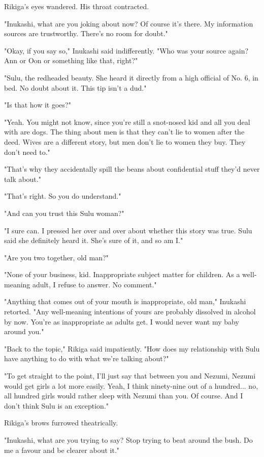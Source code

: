 Rikiga's eyes wandered. His throat contracted.

"Inukashi, what are you joking about now? Of course it's there. My
information sources are trustworthy. There's no room for doubt."

"Okay, if you say so," Inukashi said indifferently. "Who was your source
again? Ann or Oon or something like that, right?"

"Sulu, the redheaded beauty. She heard it directly from a high official
of No. 6, in bed. No doubt about it. This tip isn't a dud."

"Is that how it goes?"

"Yeah. You might not know, since you're still a snot-nosed kid and all
you deal with are dogs. The thing about men is that they can't lie to
women after the deed. Wives are a different story, but men don't lie to
women they buy. They don't need to."

"That's why they accidentally spill the beans about confidential stuff
they'd never talk about."

"That's right. So you do understand."

"And can you trust this Sulu woman?"

"I sure can. I pressed her over and over about whether this story was
true. Sulu said she definitely heard it. She's sure of it, and so am I."

"Are you two together, old man?"

"None of your business, kid. Inappropriate subject matter for children.
As a well-meaning adult, I refuse to answer. No comment."

"Anything that comes out of your mouth is inappropriate, old man,"
Inukashi retorted. "Any well-meaning intentions of yours are probably
dissolved in alcohol by now. You're as inappropriate as adults get. I
would never want my baby around you."

"Back to the topic," Rikiga said impatiently. "How does my relationship
with Sulu have anything to do with what we're talking about?"

"To get straight to the point, I'll just say that between you and
Nezumi, Nezumi would get girls a lot more easily. Yeah, I think
ninety-nine out of a hundred... no, all hundred girls would rather sleep
with Nezumi than you. Of course. And I don't think Sulu is an
exception."

Rikiga's brows furrowed theatrically.

"Inukashi, what are you trying to say? Stop trying to beat around the
bush. Do me a favour and be clearer about it."

